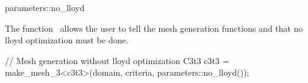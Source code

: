 \ccRefPageBegin


\begin{ccRefFunction}{parameters::no_lloyd}  %


\ccDefinition
  
The function \ccRefName\ allows the user to tell the mesh generation functions
 and  that no lloyd optimization must be done.





\ccExample

\begin{ccExampleCode}
// Mesh generation without lloyd optimization
C3t3 c3t3 = make_mesh_3<c3t3>(domain, criteria, parameters::no_lloyd());
\end{ccExampleCode}

\ccSeeAlso

 \\
 \\
 \\


\end{ccRefFunction}

\ccRefPageEnd


